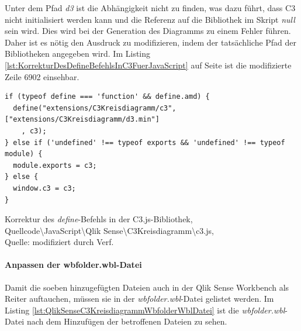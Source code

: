Unter dem Pfad \textit{d3} ist die Abhängig\-keit nicht zu finden, was dazu führt, dass C3 nicht initialisiert werden kann und die Referenz auf die Bibliothek im Skript \textit{null} sein wird. Dies wird bei der Generation des Diagramms zu einem Fehler führen. Daher ist es nötig den Ausdruck zu modifizieren, indem der tatsächliche Pfad der Bibliotheken angegeben wird. Im Listing \ref{lst:KorrekturDesDefineBefehlsInC3FuerJavaScript} auf Seite \pageref{lst:KorrekturDesDefineBefehlsInC3FuerJavaScript} ist die modifizierte Zeile 6902 einsehbar.

\ifIncludeFigures\begin{listing}[htbp]
\begin{verbatim}
if (typeof define === 'function' && define.amd) {
  define("extensions/C3Kreisdiagramm/c3", ["extensions/C3Kreisdiagramm/d3.min"]
    , c3);
} else if ('undefined' !== typeof exports && 'undefined' !== typeof module) {
  module.exports = c3;
} else {
  window.c3 = c3;
}
\end{verbatim}
\caption[Korrektur des \textit{define}-Befehls in der C3.js-Bibliothek]{Korrektur des \textit{define}-Befehls in der C3.js-Bibliothek, \\Quellcode\textbackslash{}JavaScript\textbackslash{}Qlik Sense\textbackslash{}C3Kreisdiagramm\textbackslash{}c3.js, \\Quelle: \cite{c3masayuki0812c3} modifiziert durch Verf.}
\label{lst:KorrekturDesDefineBefehlsInC3FuerJavaScript}
\end{listing}\fi

\newpage
\paragraph{Anpassen der wbfolder.wbl-Datei}

Damit die soeben hinzugefügten Dateien auch in der Qlik Sense Workbench als Reiter auftauchen, müssen sie in der \textit{wbfolder.wbl}-Datei gelistet werden. Im Listing \ref{lst:QlikSenseC3KreisdiagrammWbfolderWblDatei} ist die \textit{wbfolder.wbl}-Datei nach dem Hinzufügen der betroffenen Dateien zu sehen.

